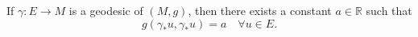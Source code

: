 If $\gamma: E \rightarrow M$ is a geodesic of $(M, g)$, then there exists a constant $a \in \mathbb{R}$ such that
$$g(\gamma_* u, \gamma_* u) = a \quad \forall u \in E.$$
